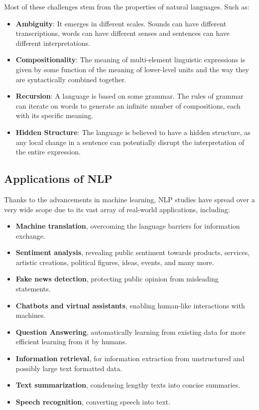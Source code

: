 Most of these challenges stem from the properties of natural languages. Such as:

\begin{itemize}
\item \textbf{Ambiguity}: It emerges in different scales. Sounds can have different transcriptions, words can have different senses and sentences can have different interpretations. 
\item \textbf{Compositionality}: The meaning of multi-element linguistic expressions is given by some function of the meaning of lower-level units and the way they are syntactically combined together.
\item \textbf{Recursion}: A language is based on some grammar. The rules of grammar can iterate on words to generate an infinite number of compositions, each with its specific meaning.
\item \textbf{Hidden Structure}: The language is believed to have a hidden structure, as any local change in a sentence can potentially disrupt the interpretation of the entire expression.
\end{itemize}

\subsection{Applications of NLP}

Thanks to the advancements in machine learning, \ac{NLP} studies have spread over a very wide scope due to its vast array of real-world applications, including:

\begin{itemize}

\item \textbf{Machine translation}, overcoming the language barriers for information exchange.
\item \textbf{Sentiment analysis}, revealing public sentiment towards products, services, artistic creations, political figures, ideas, events, and many more.
\item \textbf{Fake news detection}, protecting public opinion from misleading statements.
\item \textbf{Chatbots and virtual assistants}, enabling human-like interactions with machines.
\item \textbf{Question Answering}, automatically learning from existing data for more efficient learning from it by humans.
\item \textbf{Information retrieval}, for information extraction from unstructured and possibly large text formatted data.
\item \textbf{Text summarization}, condensing lengthy texts into concise summaries.
\item \textbf{Speech recognition}, converting speech into text.

\end{itemize}


